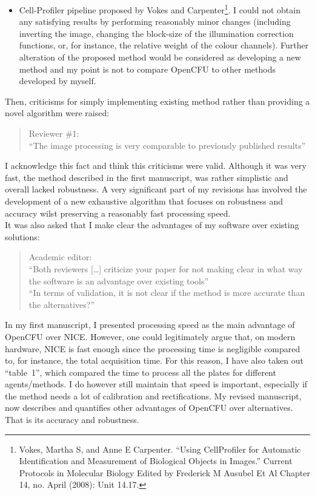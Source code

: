 \documentclass{letter}
\begin{document}
\begin{letter}{}
\begin{itemize}
 \item Cell-Profiler pipeline proposed by Vokes and
 Carpenter\footnote{Vokes, Martha S, and Anne E Carpenter. ``Using CellProfiler
 for Automatic Identification and Measurement of Biological Objects in Images.''
 Current Protocols in Molecular Biology Edited by Frederick M Ausubel Et Al
 Chapter 14, no. April (2008): Unit 14.17.}. I could not obtain any satisfying
 results by performing reasonably minor changes (including inverting the image,
 changing the block-size of the illumination correction functions, or, for
 instance, the relative weight of the colour channels). Further alteration of the proposed method would be considered as
 developing a new method and my point is not to compare OpenCFU to other
 methods developed by myself.
 \end{itemize}
 
	Then, criticisms for simply implementing existing method rather than providing a novel algorithm were raised:
  \begin{quote}
   Reviewer \#1:\\
 ``The image processing is very comparable to previously published results''
 \end{quote}
 I acknowledge this fact and think this criticisms were valid. Although it was very fast, the method
 described in the first manuscript, was rather simplistic and overall lacked robustness. 
 A very significant part of my revisions has involved the development of a new exhaustive
 algorithm that focuses on robustness and accuracy wilst preserving a reasonably fast processing speed.\\
 
 It was also asked that I make clear the advantages of my software over existing solutions:
 \begin{quote}
 Academic editor:\\
 ``Both reviewers [\ldots] criticize your paper for not making clear in what
  way the software is an advantage over existing tools''\\
  ``In terms of validation, it is not clear if the method is more accurate than the alternatives?''\\
 \end{quote}
In my first manuscript, I presented processing speed as the main advantage of OpenCFU over NICE.
However, one could legitimately argue that, on modern hardware, NICE is fast enough since the processing time is negligible compared to, for instance, the total acquisition time.
For this reason, I have also taken out ``table~1'', which compared the time to process all the plates for different agents/methods.
I do however still maintain that speed is important, especially if the method needs a lot of calibration and rectifications.
My revised manuscript, now describes and quantifies other advantages of OpenCFU over alternatives. That is its accuracy and robustness.\\
 

\end{letter}
\end{document}
